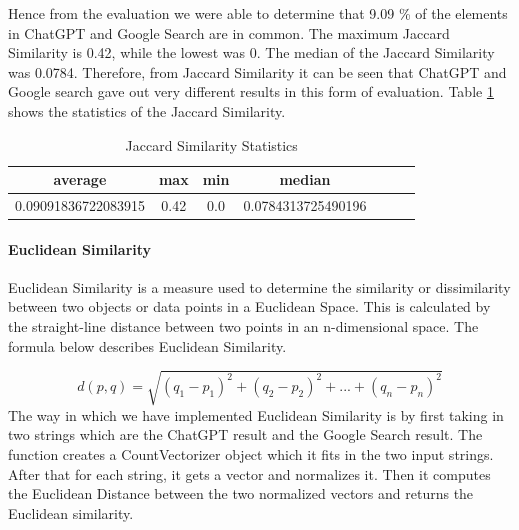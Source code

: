\documentclass[50pt]{usiinfbachelorproject}
\begin{document}

Hence from the evaluation we were able to determine that 9.09 \% of the elements in ChatGPT and Google Search are in common. The maximum Jaccard Similarity is 0.42, while the lowest was 0. The median of the Jaccard Similarity was 0.0784. Therefore, from Jaccard Similarity it can be seen that ChatGPT and Google search gave out very different results in this form of evaluation. Table \ref{tab:jaccard_similarity_statistics} shows the statistics of the Jaccard Similarity.

\begin{table}[H]
  \centering
  \begin{tabular}{|c|c|c|c|c|c|c|}
    \hline
    average & max & min & median \\
    \hline
    \hline
    0.09091836722083915 & 0.42 & 0.0 & 0.0784313725490196 \\
    \hline
  \end{tabular}
  \caption{Jaccard Similarity Statistics}
  \label{tab:jaccard_similarity_statistics}
\end{table}

\paragraph{Euclidean Similarity}
Euclidean Similarity \cite{elmore2001euclidean} is a measure used to determine the similarity or dissimilarity between two objects or data points in a Euclidean Space. This is calculated by the straight-line distance between two points in an n-dimensional space. The formula below describes Euclidean Similarity.

\begin{equation}
  d(p,q) = \sqrt{(q_1 - p_1)^2 + (q_2 - p_2)^2 + ... + (q_n - p_n)^2}
\end{equation}
The way in which we have implemented Euclidean Similarity is by first taking in two strings which are the ChatGPT result and the Google Search result. The function creates a CountVectorizer object which it fits in the two input strings. After that for each string, it gets a vector and normalizes it. Then it computes the Euclidean Distance between the two normalized vectors and returns the Euclidean similarity. 
\end{document}
